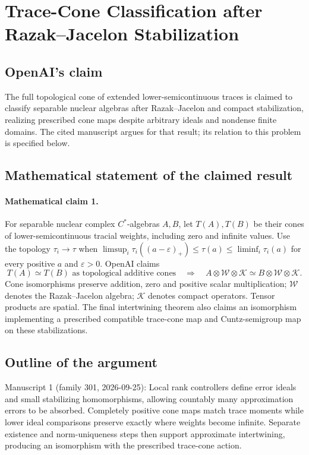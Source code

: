 \documentclass[11pt]{article}
\begin{document}
\section*{Trace-Cone Classification after Razak–Jacelon Stabilization}

\subsection{OpenAI's claim}
The full topological cone of extended lower-semicontinuous traces is claimed to classify separable nuclear algebras after Razak--Jacelon and compact stabilization, realizing prescribed cone maps despite arbitrary ideals and nondense finite domains. The cited manuscript argues for that result; its relation to this problem is specified below.

\subsection{Mathematical statement of the claimed result}
\paragraph{Mathematical claim 1.} For separable nuclear complex $C^*$-algebras $A,B$, let $T(A),T(B)$ be their cones of lower-semicontinuous tracial weights, including zero and infinite values. Use the topology $\tau_i\to\tau$ when $\limsup_i\tau_i((a-\varepsilon)_+)\le\tau(a)\le\liminf_i\tau_i(a)$ for every positive $a$ and $\varepsilon>0$. OpenAI claims
\[
T(A)\simeq T(B)\text{ as topological additive cones}\quad\Longrightarrow\quad
A\otimes\mathcal W\otimes\mathcal K\simeq B\otimes\mathcal W\otimes\mathcal K.
\]
Cone isomorphisms preserve addition, zero and positive scalar multiplication; $\mathcal W$ denotes the Razak--Jacelon algebra; $\mathcal K$ denotes compact operators. Tensor products are spatial. The final intertwining theorem also claims an isomorphism implementing a prescribed compatible trace-cone map and Cuntz-semigroup map on these stabilizations.

\subsection{Outline of the argument}
Manuscript 1 (family 301, 2026-09-25): Local rank controllers define error ideals and small stabilizing homomorphisms, allowing countably many approximation errors to be absorbed. Completely positive cone maps match trace moments while lower ideal comparisons preserve exactly where weights become infinite. Separate existence and norm-uniqueness steps then support approximate intertwining, producing an isomorphism with the prescribed trace-cone action.
\end{document}
